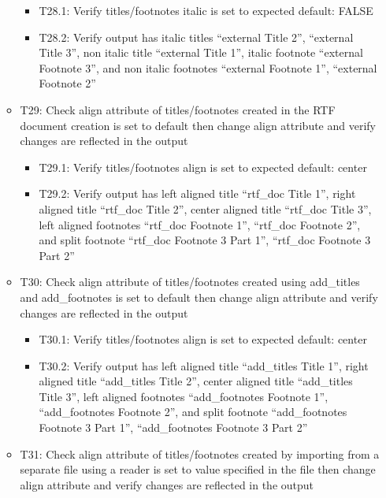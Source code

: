 \documentclass[]{article}
\providecommand{\tightlist}{%
  \setlength{\itemsep}{0pt}\setlength{\parskip}{0pt}}
\begin{document}
\begin{itemize}
\begin{itemize}
    \begin{itemize}
    \tightlist
    \item
      T28.1: Verify titles/footnotes italic is set to expected default:
      FALSE
    \item
      T28.2: Verify output has italic titles ``external Title 2'',
      ``external Title 3'', non italic title ``external Title 1'',
      italic footnote ``external Footnote 3'', and non italic footnotes
      ``external Footnote 1'', ``external Footnote 2''
    \end{itemize}
  \item
    T29: Check align attribute of titles/footnotes created in the RTF
    document creation is set to default then change align attribute and
    verify changes are reflected in the output

    \begin{itemize}
    \tightlist
    \item
      T29.1: Verify titles/footnotes align is set to expected default:
      center
    \item
      T29.2: Verify output has left aligned title ``rtf\_doc Title 1'',
      right aligned title ``rtf\_doc Title 2'', center aligned title
      ``rtf\_doc Title 3'', left aligned footnotes ``rtf\_doc Footnote
      1'', ``rtf\_doc Footnote 2'', and split footnote ``rtf\_doc
      Footnote 3 Part 1'', ``rtf\_doc Footnote 3 Part 2''
    \end{itemize}
  \item
    T30: Check align attribute of titles/footnotes created using
    add\_titles and add\_footnotes is set to default then change align
    attribute and verify changes are reflected in the output

    \begin{itemize}
    \tightlist
    \item
      T30.1: Verify titles/footnotes align is set to expected default:
      center
    \item
      T30.2: Verify output has left aligned title ``add\_titles Title
      1'', right aligned title ``add\_titles Title 2'', center aligned
      title ``add\_titles Title 3'', left aligned footnotes
      ``add\_footnotes Footnote 1'', ``add\_footnotes Footnote 2'', and
      split footnote ``add\_footnotes Footnote 3 Part 1'',
      ``add\_footnotes Footnote 3 Part 2''
    \end{itemize}
  \item
    T31: Check align attribute of titles/footnotes created by importing
    from a separate file using a reader is set to value specified in the
    file then change align attribute and verify changes are reflected in
    the output


\end{itemize}
\end{itemize}
\end{document}

